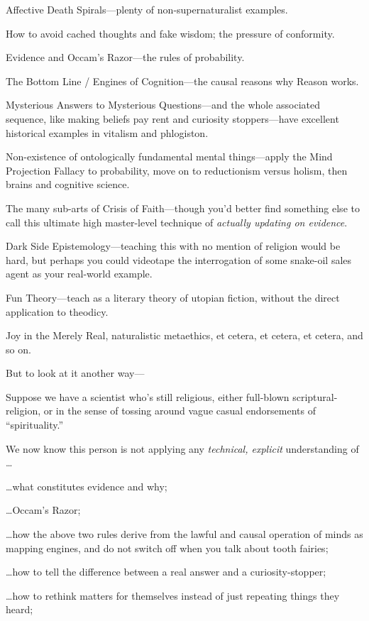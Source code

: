 {
 Affective Death Spirals---plenty of non-supernaturalist examples.}

{
 How to avoid cached thoughts and fake wisdom; the pressure of
conformity.}

{
 Evidence and Occam's Razor---the rules of
probability.}

{
 The Bottom Line / Engines of Cognition---the causal reasons why
Reason works.}

{
 Mysterious Answers to Mysterious Questions---and the whole
associated sequence, like making beliefs pay rent and curiosity
stoppers---have excellent historical examples in vitalism and
phlogiston.}

{
 Non-existence of ontologically fundamental mental things---apply
the Mind Projection Fallacy to probability, move on to reductionism
versus holism, then brains and cognitive science.}

{
 The many sub-arts of Crisis of Faith---though
you'd better find something else to call this ultimate
high master-level technique of \textit{actually updating on evidence}.}

{
 Dark Side Epistemology---teaching this with no mention of religion
would be hard, but perhaps you could videotape the interrogation of
some snake-oil sales agent as your real-world example.}

{
 Fun Theory{}---teach as a literary theory of utopian fiction,
without the direct application to theodicy.}

{
 Joy in the Merely Real, naturalistic metaethics, et cetera, et
cetera, et cetera, and so on.}

{
 But to look at it another way---}

{
 Suppose we have a scientist who's still religious,
either full-blown scriptural-religion, or in the sense of tossing
around vague casual endorsements of
``spirituality.''}

{
 We now know this person is not applying any \textit{technical,
explicit} understanding of \ldots}

{
 \ldots what constitutes evidence and why;}

{
 \ldots Occam's Razor;}

{
 \ldots how the above two rules derive from the lawful and causal
operation of minds as mapping engines, and do not switch off when you
talk about tooth fairies;}

{
 \ldots how to tell the difference between a real answer and a
curiosity-stopper;}

{
 \ldots how to rethink matters for themselves instead of just
repeating things they heard;}

